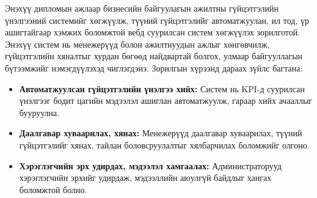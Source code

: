 Энэхүү дипломын ажлаар бизнесийн байгуулагын ажилтны гүйцэтгэлийн үнэлгээний системийг хөгжүүлж, 
түүний гүйцэтгэлийг автоматжуулан, ил тод, үр ашигтайгаар хэмжих боломжтой вебд 
суурилсан систем хөгжүүлэх зорилготой. Энэхүү систем нь менежерүүд болон ажилтнуудын ажлыг хөнгөвчилж, 
гүйцэтгэлийн хяналтыг хурдан бөгөөд найдвартай болгох, улмаар байгууллагын бүтээмжийг нэмэгдүүлэхэд чиглэгдэнэ.
Зорилгын хүрээнд дараах зүйлс багтана:
\begin{itemize}
    \item \textbf{Автоматжуулсан гүйцэтгэлийн үнэлгээ хийх:} Систем нь KPI-д суурилсан үнэлгээг бодит цагийн мэдээлэл ашиглан автоматжуулж, гараар хийх ачааллыг бууруулна.
    \item \textbf{Даалгавар хуваарилах, хянах:} Менежерүүд даалгавар хуваарилах, түүний гүйцэтгэлийг хянах, тайлан боловсруулалтыг хялбарчилах боломжийг олгоно.
    \item \textbf{Хэрэглэгчийн эрх удирдах, мэдээлэл хамгаалах:} Администраторууд хэрэглэгчийн эрхийг удирдаж, мэдээллийн аюулгүй байдлыг хангах боломжтой болно.
\end{itemize}